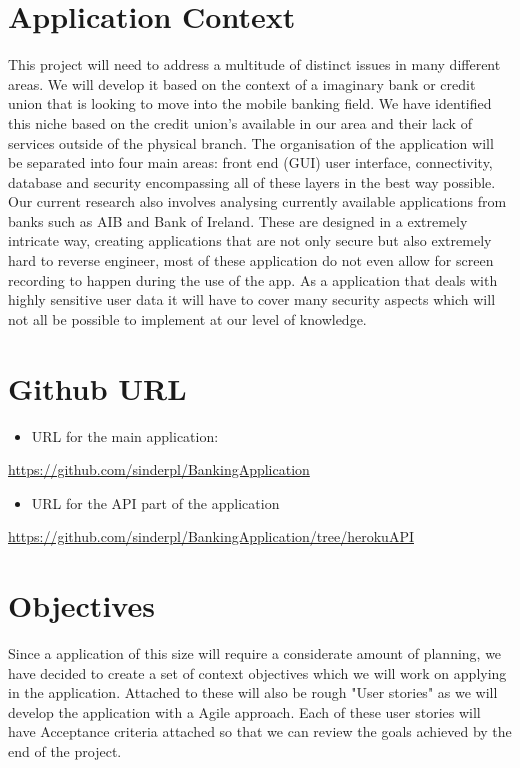 \section{Application Context}
    This project will need to address a multitude of distinct issues in many different areas. We will develop it based on the context of a imaginary bank or credit union that is looking to move into the mobile banking field. We have identified this niche based on the credit union's available in our area and their lack of services outside of the physical branch.
    The organisation of the application will be separated into four main areas: front end (GUI) user interface, connectivity, database and security encompassing all of these layers in the best way possible.
    Our current research also involves analysing currently available applications from banks such as AIB and Bank of Ireland. These are designed in a extremely intricate way, creating applications that are not only secure but also extremely hard to reverse engineer, most of these application do not even allow for screen recording to happen during the use of the app.
    As a application that deals with highly sensitive user data it will have to cover many security aspects which will not all be possible to implement at our level of knowledge.

\section{Github URL}
    \begin{itemize}
    \item URL for the main application:
    \end{itemize}
    \url{https://github.com/sinderpl/BankingApplication}
    \begin{itemize}
    \item URL for the API part of the application
    \end{itemize}
    \url{https://github.com/sinderpl/BankingApplication/tree/herokuAPI}




\section{Objectives}
    Since a application of this size will require a considerate amount of planning, we have decided to create a set of context objectives which we will work on applying in the application. Attached to these will also be rough "User stories" as we will develop the application with a Agile approach.\cite{userStories} Each of these user stories will have Acceptance criteria attached so that we can review the goals achieved by the end of the project.
